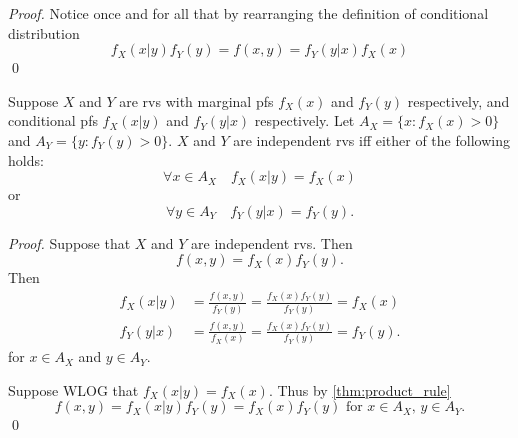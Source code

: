 \documentclass[notoc,notitlepage]{tufte-book}
\begin{document}
\begin{proof}
  Notice once and for all that by rearranging the definition of conditional distribution
  \begin{equation*}
    f_X(x | y) f_Y(y) = f(x, y) = f_Y(y | x) f_X(x)
  \end{equation*}\qed
\end{proof}

\begin{propo}
\label{propo:independence_from_conditionality}
  Suppose $X$ and $Y$ are rvs with marginal pfs $f_X(x)$ and $f_Y(y)$ respectively, and conditional pfs $f_X(x | y)$ and $f_Y(y | x)$ respectively. Let $A_X = \{x : f_X(x) > 0\}$ and $A_Y = \{ y : f_Y(y) > 0 \}$. $X$ and $Y$ are independent rvs iff either of the following holds:
  \begin{equation*}
    \forall x \in A_X \quad f_X(x | y) = f_X(x)
  \end{equation*}
  or
  \begin{equation*}
    \forall y \in A_Y \quad f_Y(y | x) = f_Y(y).
  \end{equation*}
\end{propo}

\begin{proof}
  Suppose that $X$ and $Y$ are independent rvs. Then
  \begin{equation*}
    f(x, y) = f_X(x) f_Y(y).
  \end{equation*}
  Then
  \begin{align*}
    f_X(x | y) &= \frac{f(x, y)}{f_Y(y)} = \frac{f_X(x) f_Y(y)}{f_Y(y)} = f_X(x) \\
    f_Y(y | x) &= \frac{f(x, y)}{f_X(x)} = \frac{f_X(x) f_Y(y)}{f_Y(y)} = f_Y(y).
  \end{align*}
  for $x \in A_X$ and $y \in A_Y$.

  Suppose WLOG that $f_X(x | y) = f_X(x)$. Thus by \cref{thm:product_rule}
  \begin{equation*}
    f(x, y) = f_X(x | y) f_Y(y) = f_X(x) f_Y(y) \text{ for } x \in A_X, \, y \in A_Y.
  \end{equation*}
  \qed
\end{proof}
\end{document}
